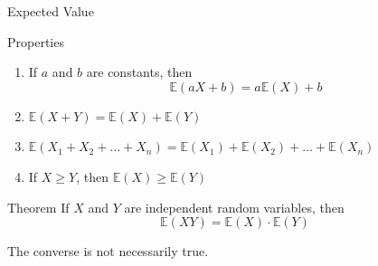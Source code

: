 \documentclass{beamer}
\newcommand{\E}{\mathbb{E}}
\begin{document}
\begin{frame}{Expected Value}
\begin{block}{Properties}
    \begin{enumerate}[<+->]
        \item If $a$ and $b$ are constants, then
        \[
        \E(aX+b)=a\E(X)+b
        \]
        \item $\E(X+Y)=\E(X)+\E(Y)$
        \item $\E(X_1+X_2+\dots+X_n)=\E(X_1)+\E(X_2)+\dots+\E(X_n)$
        \item If $X\ge Y$, then $\E(X)\ge \E(Y)$
    \end{enumerate}
\end{block}
\pause
\begin{block}{Theorem}
    If \( X \) and \( Y \) are independent random variables, then
\[\mathbb{E}(XY) = \mathbb{E}(X)\cdot \mathbb{E}(Y) \]

\end{block}
The converse is not necessarily true.

\end{frame}




    
    
    
    

    
    







    
\end{document}
